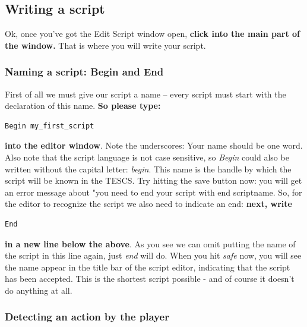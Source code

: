 \hypertarget{writing-a-script}{%
\subsection{Writing a script}\label{writing-a-script}}

Ok, once you've got the Edit Script window open, \textbf{click into the main part of the window.} That is where you will write your script.

\hypertarget{naming-a-script-begin-and-end}{%
\subsubsection{Naming a script: Begin and End}\label{naming-a-script-begin-and-end}}

First of all we must give our script a name -- every script must start with the declaration of this name. \textbf{So please type:}

\begin{lstlisting}
Begin my_first_script
\end{lstlisting}

\textbf{into the editor window}. Note the underscores: Your name should be one word. Also note that the script language is not case sensitive, so \emph{Begin} could also be written without the capital letter: \emph{begin}. This name is the handle by which the script will be known in the TESCS. Try hitting the save button now: you will get an error message about "you need to end your script with end scriptname. So, for the editor to recognize the script we also need to indicate an
end: \textbf{next, write}

\begin{lstlisting}
End
\end{lstlisting}

\textbf{in a new line below the above}. As you see we can omit putting the name of the script in this line again, just \emph{end} will do. When you hit \emph{safe} now, you will see the name appear in the title bar of the script editor, indicating that the script has been accepted. This is the shortest script possible - and of course it doesn't do anything at all.

\hypertarget{detecting-an-action-by-the-player}{%
\subsubsection{Detecting an action by the player}\label{detecting-an-action-by-the-player}}

